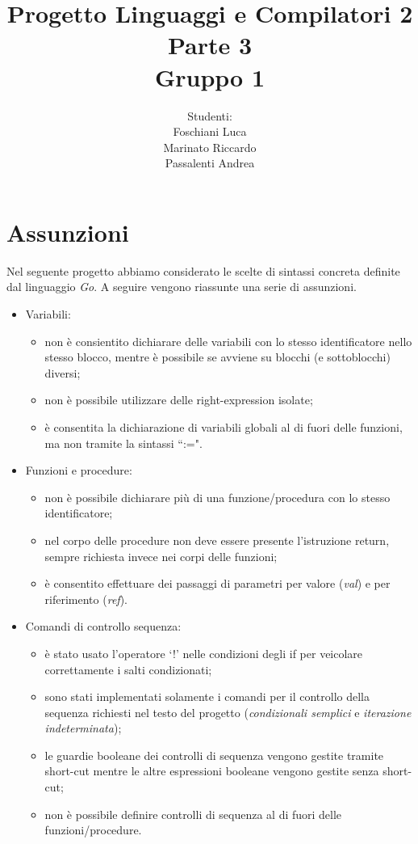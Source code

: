 \documentclass[12pt]{article}
\begin{document}
\title{\noindent \Huge Progetto Linguaggi e Compilatori 2\\ Parte 3 \\ Gruppo 1}
\date{}
\author{Studenti: \\Foschiani Luca\\ Marinato Riccardo \\Passalenti Andrea}

\maketitle
\newpage

\section{Assunzioni}
Nel seguente progetto abbiamo considerato le scelte di sintassi concreta definite dal linguaggio \textit{Go}.
A seguire vengono riassunte una serie di assunzioni.

\begin{itemize}
\item Variabili:
	\begin{itemize}
		\item non è consientito dichiarare delle variabili con lo stesso identificatore nello stesso blocco, mentre è possibile se avviene su blocchi (e sottoblocchi) diversi;
		\item non è possibile utilizzare delle right-expression isolate;
		\item è consentita la dichiarazione di variabili globali al di fuori delle funzioni, ma non tramite la sintassi ``:=".
	\end{itemize}
\item Funzioni e procedure:
	\begin{itemize}
		\item non è possibile dichiarare più di una funzione/procedura con lo stesso identificatore;
		\item nel corpo delle procedure non deve essere presente l'istruzione return, sempre richiesta invece nei corpi delle funzioni;
		\item è consentito effettuare dei passaggi di parametri per valore (\textit{val}) e per riferimento (\textit{ref}).
	\end{itemize}
\item Comandi di controllo sequenza:
	\begin{itemize}
		\item è stato usato l'operatore `!' nelle condizioni degli if per veicolare correttamente i salti condizionati;
		\item sono stati implementati solamente i comandi per il controllo della sequenza richiesti nel testo del progetto (\textit{condizionali semplici} e \textit{iterazione indeterminata});
		\item le guardie booleane dei controlli di sequenza vengono gestite tramite short-cut mentre le altre espressioni booleane vengono gestite senza short-cut;
		\item non è possibile definire controlli di sequenza al di fuori delle funzioni/procedure.
	\end{itemize}
\end{itemize}
\end{document}
